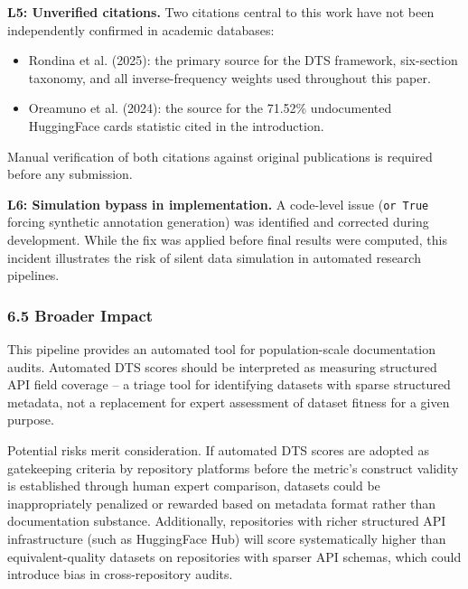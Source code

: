\textbf{L5: Unverified citations.} Two citations central to this work have not been independently confirmed in academic databases:
\begin{itemize}
\item Rondina et al. (2025): the primary source for the DTS framework, six-section taxonomy, and all inverse-frequency weights used throughout this paper.
\item Oreamuno et al. (2024): the source for the 71.52\% undocumented HuggingFace cards statistic cited in the introduction.
\end{itemize}

Manual verification of both citations against original publications is required before any submission.

\textbf{L6: Simulation bypass in implementation.} A code-level issue (\texttt{or True} forcing synthetic annotation generation) was identified and corrected during development. While the fix was applied before final results were computed, this incident illustrates the risk of silent data simulation in automated research pipelines.

\subsubsection{6.5 Broader Impact}

This pipeline provides an automated tool for population-scale documentation audits. Automated DTS scores should be interpreted as measuring structured API field coverage -- a triage tool for identifying datasets with sparse structured metadata, not a replacement for expert assessment of dataset fitness for a given purpose.

Potential risks merit consideration. If automated DTS scores are adopted as gatekeeping criteria by repository platforms before the metric's construct validity is established through human expert comparison, datasets could be inappropriately penalized or rewarded based on metadata format rather than documentation substance. Additionally, repositories with richer structured API infrastructure (such as HuggingFace Hub) will score systematically higher than equivalent-quality datasets on repositories with sparser API schemas, which could introduce bias in cross-repository audits.

